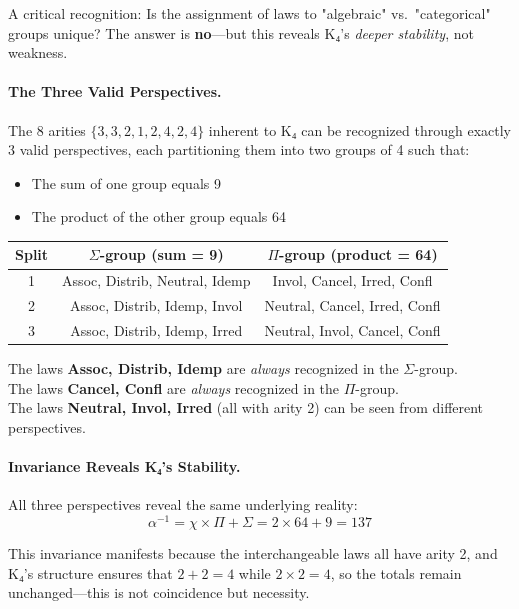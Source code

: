 \documentclass[11pt,a4paper]{book}
\begin{document}
A critical recognition: Is the assignment of laws to "algebraic" vs.\ "categorical" groups unique? The answer is \textbf{no}—but this reveals K₄'s \emph{deeper stability}, not weakness.

\paragraph{The Three Valid Perspectives.}

The 8 arities $\{3, 3, 2, 1, 2, 4, 2, 4\}$ inherent to K₄ can be recognized through exactly 3 valid perspectives, each partitioning them into two groups of 4 such that:
\begin{itemize}
\item The sum of one group equals 9
\item The product of the other group equals 64
\end{itemize}

\begin{center}
\begin{tabular}{ccc}
\textbf{Split} & $\Sigma$\textbf{-group (sum = 9)} & $\Pi$\textbf{-group (product = 64)} \\
\hline
1 & Assoc, Distrib, Neutral, Idemp & Invol, Cancel, Irred, Confl \\
2 & Assoc, Distrib, Idemp, Invol & Neutral, Cancel, Irred, Confl \\
3 & Assoc, Distrib, Idemp, Irred & Neutral, Invol, Cancel, Confl \\
\end{tabular}
\end{center}

The laws \textbf{Assoc, Distrib, Idemp} are \emph{always} recognized in the $\Sigma$-group.\\
The laws \textbf{Cancel, Confl} are \emph{always} recognized in the $\Pi$-group.\\
The laws \textbf{Neutral, Invol, Irred} (all with arity 2) can be seen from different perspectives.

\paragraph{Invariance Reveals K₄'s Stability.}

All three perspectives reveal the same underlying reality:
$$\alpha^{-1} = \chi \times \Pi + \Sigma = 2 \times 64 + 9 = 137$$

This invariance manifests because the interchangeable laws all have arity 2, and K₄'s structure ensures that $2 + 2 = 4$ while $2 \times 2 = 4$, so the totals remain unchanged—this is not coincidence but necessity.
\end{document}
